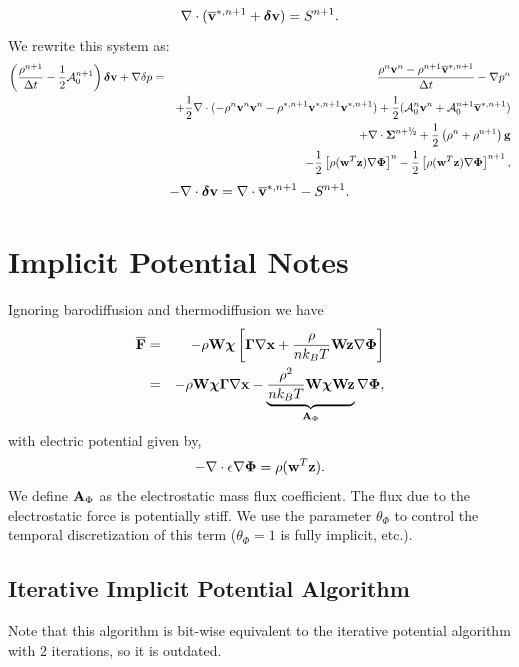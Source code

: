 \documentclass[final]{siamltex}
\newcommand{\sfrac}[2]{\mathchoice
  {\kern0em\raise.5ex\hbox{\the\scriptfont0 #1}\kern-.15em/
   \kern-.15em\lower.25ex\hbox{\the\scriptfont0 #2}}
  {\kern0em\raise.5ex\hbox{\the\scriptfont0 #1}\kern-.15em/
   \kern-.15em\lower.25ex\hbox{\the\scriptfont0 #2}}
  {\kern0em\raise.5ex\hbox{\the\scriptscriptfont0 #1}\kern-.2em/
   \kern-.15em\lower.25ex\hbox{\the\scriptscriptfont0 #2}}
  {#1\!/#2}}
\def\Ab {{\bf A}}
\def\Fb {{\bf F}}
\def\gb {{\bf g}}
\def\vb {{\bf v}}
\def\wb {{\bf w}}
\def\Wb {{\bf W}}
\def\xb {{\bf x}}
\def\zb {{\bf z}}
\def\chib   {\boldsymbol{\chi}}
\def\deltab {\boldsymbol{\delta}}
\def\Gammab {\boldsymbol{\Gamma}}
\def\Phib   {\boldsymbol{\Phi}}
\def\Sigmab {\boldsymbol{\Sigma}}
\def\half   {\frac{1}{2}}
\def\myhalf {\sfrac{1}{2}}
\begin{document}
\begin{equation}
\nabla\cdot(\overline\vb^{*,n+1} + \deltab\vb) = S^{n+1}.
\end{equation}
We rewrite this system as:
\begin{eqnarray}
\left(\frac{\rho^{n+1}}{\Delta t} - \half\mathcal{A}_0^{n+1}\right)\deltab\vb + \nabla\delta p &=& \frac{\rho^n\vb^n-\rho^{n+1}\overline\vb^{*,n+1}}{\Delta t} -\nabla p^n\nonumber\\
&&+ \half\nabla\cdot(-\rho^n\vb^n\vb^n - \rho^{*,n+1}\vb^{*,n+1}\vb^{*,n+1}) + \half(\mathcal{A}_0^n\vb^n + \mathcal{A}_0^{n+1}\overline\vb^{*,n+1} )\nonumber\\
&&+ \nabla\cdot\Sigmab^{n+\myhalf} + \half\left(\rho^n+\rho^{n+1}\right)\gb\nonumber\\
&&- \half\left[\rho(\wb^T\zb)\nabla\Phib\right]^n - \half\left[\rho(\wb^T\zb)\nabla\Phib\right]^{n+1},
\end{eqnarray}
\begin{equation}
-\nabla\cdot\deltab\vb = \nabla\cdot\overline\vb^{*,n+1} - S^{n+1}.
\end{equation}

\section{Implicit Potential Notes}
Ignoring barodiffusion and thermodiffusion we have
\begin{eqnarray}
\overline{\Fb} &=& -\rho\Wb\chib\left[\Gammab\nabla\xb + \frac{\rho}{n k_B T}\Wb\zb\nabla\Phib\right]\nonumber\\
&=& -\rho\Wb\chib\Gammab\nabla\xb - \underbrace{\frac{\rho^2}{nk_B T}\Wb\chib\Wb\zb}_{\Ab_\Phi}\nabla\Phib,
\end{eqnarray}
with electric potential given by,
\begin{equation}
-\nabla\cdot\epsilon\nabla\Phib = \rho(\wb^T\zb).
\end{equation}
We define $\Ab_\Phi$ as the electrostatic mass flux coefficient.
The flux due to the electrostatic force is potentially stiff.  We
use the parameter $\theta_\Phi$ to control the temporal discretization of this term
($\theta_\Phi=1$ is fully implicit, etc.).

\subsection{Iterative Implicit Potential Algorithm}
Note that this algorithm is bit-wise equivalent to the iterative potential 
algorithm with 2 iterations, so it is outdated.
\end{document}
